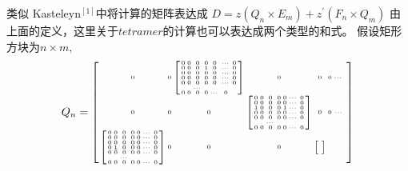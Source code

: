 \documentclass{amsc}          %
\numberwithin{equation}{section} %
\begin{document}
类似 Kasteleyn$^{[1]}$中将计算的矩阵表达成
$D=z(Q_{n}\times E_{m})  +  z^{'} (F_{n} \times Q_{m})$
由上面的定义，这里关于$tetramer$的计算也可以表达成两个类型的和式。
假设矩形方块为$n\times m$,
$$
 \tiny
  Q_{n} = \begin{bmatrix}\begin{smallmatrix}
  0& 0&
  \begin{bmatrix}\begin{smallmatrix}
 0& 0& 0&0&0&\cdots&0\\
 0& 0& 0&1&0&\cdots&0\\
 0& 0& 0&0&0&\cdots&0\\
 0& 0& 0&0&0&\cdots&0\\
 0& 0& 0&0&0&\cdots&0\\
 & & \cdots& &\\
0& 0&0& 0&\cdots&0\\
 \end{smallmatrix}\end{bmatrix}& 0& 0& 0& \cdots&\\
 0& 0& 0&
   \begin{bmatrix}\begin{smallmatrix}
 0& 0& 0&0&0&\cdots&0\\
 0& 0& 0&0&0&\cdots&0\\
 1& 0& 0&0&1&\cdots&0\\
 0& 0& 0&0&0&\cdots&0\\
 0& 0& 0&0&0&\cdots&0\\
 & & \cdots& &\\
0& 0&0& 0&0&\cdots&0\\
 \end{smallmatrix}\end{bmatrix}&0& 0&\cdots\\
 \begin{bmatrix}\begin{smallmatrix}
 0& 0& 0&0&0&\cdots&0\\
 0& 0& 0&0&0&\cdots&0\\
 0& 0& 0&0&0&\cdots&0\\
 0& 1& 0&0&0&\cdots&0\\
 0& 0& 0&0&0&\cdots&0\\
 & & \cdots& &\\
0& 0& 0& 0&0&\cdots&0\\
 \end{smallmatrix}\end{bmatrix}&
 0& 0& 0&
 \begin{bmatrix}\begin{smallmatrix}

\end{smallmatrix}
\end{bmatrix}
\end{smallmatrix}
\end{bmatrix}$$
\end{document}
